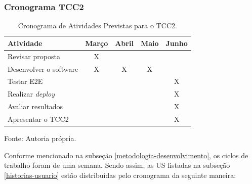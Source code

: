 \newpage

\subsubsection[Cronograma TCC2]{Cronograma TCC2}

\begin{table}[h!]
\centering
\caption{Cronograma de Atividades Previstas para o TCC2.}
\label{tab:cronograma-atividades-corrigido}
\small
\setlength{\tabcolsep}{4pt}
\begin{tabular}{|l|c|c|c|c|}
\hline
\textbf{Atividade} & \textbf{Março} & \textbf{Abril} & \textbf{Maio} & \textbf{Junho} \\ 
\hline \hline
Revisar proposta & X & & & \\ 
\hline
Desenvolver o software & X & X & X &  \\ 
\hline
Testar E2E & & & & X  \\ 
\hline
Realizar \textit{deploy} & & & & X  \\ 
\hline
Avaliar resultados & & & & X \\ 
\hline
Apresentar o TCC2 & & & & X \\ 
\hline
\end{tabular}
\par\vspace{2mm}
 Fonte: Autoria própria.
\end{table}

Conforme mencionado na subseção \ref{metodologia-desenvolvimento}, os ciclos de trabalho foram de uma semana. Sendo assim, as US listadas na subseção \ref{historias-usuario} estão distribuídas pelo cronograma da seguinte maneira:

